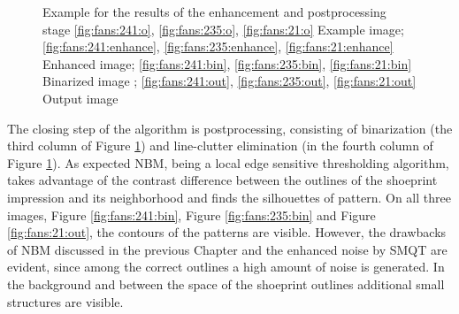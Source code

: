 \documentclass[draft,final]{vutinfth} %
\begin{document}
{\begin{figure}[H]

\caption{Example for the results of the enhancement and postprocessing stage
				\ref{fig:fans:241:o}, \ref{fig:fans:235:o}, \ref{fig:fans:21:o} Example image; \ref{fig:fans:241:enhance}, \ref{fig:fans:235:enhance}, \ref{fig:fans:21:enhance} Enhanced image; \ref{fig:fans:241:bin}, \ref{fig:fans:235:bin}, \ref{fig:fans:21:bin} Binarized image ; \ref{fig:fans:241:out}, \ref{fig:fans:235:out}, \ref{fig:fans:21:out} Output image}
\label{fig:fans:enhance}

\end{figure}
}
\par
The closing step of the algorithm is postprocessing, consisting of binarization (the third column of Figure \ref{fig:fans:enhance}) and line-clutter elimination (in the fourth column of Figure \ref{fig:fans:enhance}).
As expected NBM, being a local edge sensitive thresholding algorithm, takes advantage of the contrast difference between the outlines of the shoeprint impression and its neighborhood and finds the silhouettes of pattern. 
On all three images, Figure \ref{fig:fans:241:bin}, Figure \ref{fig:fans:235:bin} and Figure \ref{fig:fans:21:out}, the contours of the patterns are visible.
However, the drawbacks of NBM discussed in the previous Chapter and the enhanced noise by SMQT are evident, since among the correct outlines a high amount of noise is generated.
In the background and between the space of the shoeprint outlines additional small structures are visible.
\end{document}
